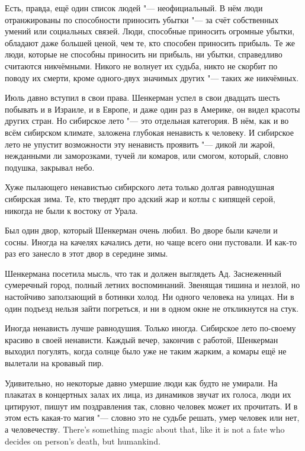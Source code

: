 Есть, правда, ещё один список людей "--- неофициальный.
В нём люди отранжированы по способности приносить убытки "--- за счёт собственных умений или социальных связей.
Люди, способные приносить огромные убытки, обладают даже большей ценой, чем те, кто способен приносить прибыль.
Те же люди, которые не способны приносить ни прибыль, ни убытки, справедливо считаются никчёмными.
Никого не волнует их судьба, никто не скорбит по поводу их смерти, кроме одного-двух значимых других "--- таких же никчёмных.

\asterism

Июль давно вступил в свои права.
Шенкерман успел в свои двадцать шесть побывать и в Израиле, и в Европе, и даже один раз в Америке, он видел красоты других стран.
Но сибирское лето "--- это отдельная категория.
В нём, как и во всём сибирском климате, заложена глубокая ненависть к человеку.
И сибирское лето не упустит возможности эту ненависть проявить "--- дикой ли жарой, нежданными ли заморозками, тучей ли комаров, или смогом, который, словно подушка, закрывал небо.

Хуже пылающего ненавистью сибирского лета только долгая равнодушная сибирская зима.
Те, кто твердят про адский жар и котлы с кипящей серой, никогда не были к востоку от Урала.

Был один двор, который Шенкерман очень любил.
Во дворе были качели и сосны.
Иногда на качелях качались дети, но чаще всего они пустовали.
И как-то раз его занесло в этот двор в середине зимы.

Шенкермана посетила мысль, что так и должен выглядеть Ад.
Заснеженный сумеречный город, полный летних воспоминаний.
Звенящая тишина и незлой, но настойчиво заползающий в ботинки холод.
Ни одного человека на улицах.
Ни в один подъезд нельзя зайти погреться, и ни в одном окне не откликнутся на стук.

Иногда ненависть лучше равнодушия.
Только иногда.
Сибирское лето по-своему красиво в своей ненависти.
Каждый вечер, закончив с работой, Шенкерман выходил погулять, когда солнце было уже не таким жарким, а комары ещё не вылетали на кровавый пир.

Удивительно, но некоторые давно умершие люди как будто не умирали.
На плакатах в концертных залах их лица, из динамиков звучат их голоса, люди их цитируют, пишут им поздравления так, словно человек может их прочитать.
{И в этом есть какая-то магия "--- словно это не судьбе решать, умер человек или нет, а человечеству.}
{There's something magic about that, like it is not a fate who decides on person's death, but humankind.}

